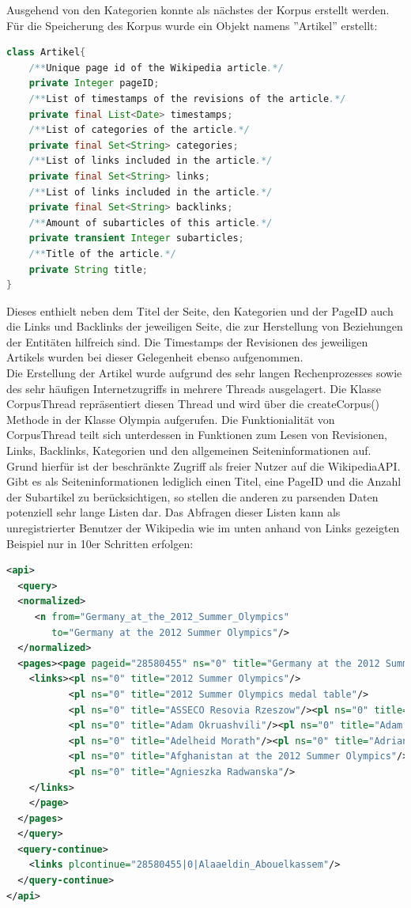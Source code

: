 \documentclass[pagesize=auto, titlepage=on]{scrartcl}
\begin{document}
\clearpage
Ausgehend von den Kategorien konnte als nächstes der Korpus erstellt werden.
Für die Speicherung des Korpus wurde ein Objekt namens ''Artikel'' erstellt:
\begin{lstlisting}[language=Java]class Artikel{
	/**Unique page id of the Wikipedia article.*/
    private Integer pageID;
    /**List of timestamps of the revisions of the article.*/
    private final List<Date> timestamps;
    /**List of categories of the article.*/
    private final Set<String> categories;
    /**List of links included in the article.*/
    private final Set<String> links;
    /**List of links included in the article.*/
    private final Set<String> backlinks;
    /**Amount of subarticles of this article.*/
    private transient Integer subarticles;
    /**Title of the article.*/
    private String title;
}
\end{lstlisting}
Dieses enthielt neben dem Titel der Seite, den Kategorien und der PageID auch die Links und Backlinks der jeweiligen Seite, die zur Herstellung von Beziehungen der Entitäten hilfreich sind. Die Timestamps der Revisionen des jeweiligen Artikels wurden bei dieser Gelegenheit ebenso aufgenommen.\\
Die Erstellung der Artikel wurde aufgrund des sehr langen Rechenprozesses sowie des sehr häufigen Internetzugriffs in mehrere Threads ausgelagert. Die Klasse CorpusThread repräsentiert diesen Thread und wird über die createCorpus() Methode in der Klasse Olympia aufgerufen. Die Funktionialität von CorpusThread teilt sich unterdessen in Funktionen zum Lesen von Revisionen, Links, Backlinks, Kategorien und den allgemeinen Seiteninformationen auf.\\
Grund hierfür ist der beschränkte Zugriff als freier Nutzer auf die WikipediaAPI. Gibt es als Seiteninformationen lediglich einen Titel, eine PageID und die Anzahl der Subartikel zu berücksichtigen, so stellen die anderen zu parsenden Daten potenziell sehr lange Listen dar. Das Abfragen dieser Listen kann als unregistrierter Benutzer der Wikipedia wie im unten anhand von Links gezeigten Beispiel nur in 10er Schritten erfolgen:
\begin{lstlisting}[language=XML]<api>
  <query>
  <normalized>
     <n from="Germany_at_the_2012_Summer_Olympics" 
        to="Germany at the 2012 Summer Olympics"/>
  </normalized>
  <pages><page pageid="28580455" ns="0" title="Germany at the 2012 Summer Olympics">
    <links><pl ns="0" title="2012 Summer Olympics"/>
    	   <pl ns="0" title="2012 Summer Olympics medal table"/>
           <pl ns="0" title="ASSECO Resovia Rzeszow"/><pl ns="0" title="Abdelhafid Benchabla"/>
           <pl ns="0" title="Adam Okruashvili"/><pl ns="0" title="Adam Skrodzki"/>
           <pl ns="0" title="Adelheid Morath"/><pl ns="0" title="Adrian Crisan"/>
           <pl ns="0" title="Afghanistan at the 2012 Summer Olympics"/>
           <pl ns="0" title="Agnieszka Radwanska"/>
    </links>
    </page>
  </pages>
  </query>
  <query-continue>
    <links plcontinue="28580455|0|Alaaeldin_Abouelkassem"/>
  </query-continue>
</api>\end{lstlisting}
\end{document}
